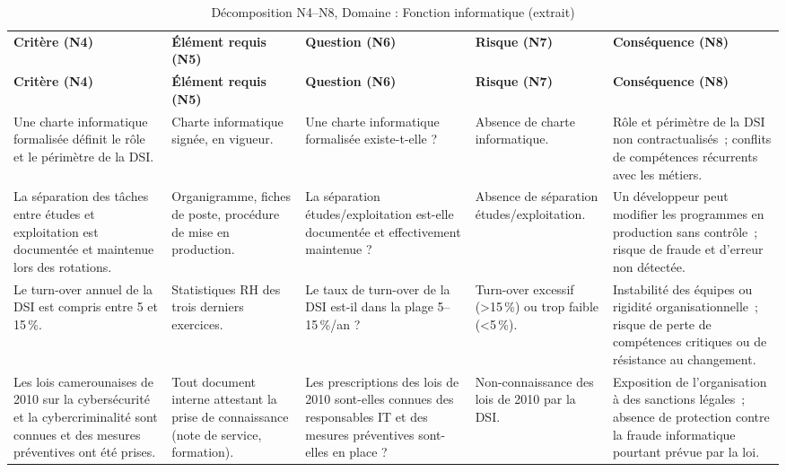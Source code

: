 \begin{longtable}{p{2.3cm}p{2.3cm}p{2.1cm}p{2.0cm}p{2.3cm}}
\small
\caption{Décomposition N4--N8, Domaine : Fonction informatique (extrait)} \\
\toprule
\textbf{Critère (N4)} & \textbf{Élément requis (N5)} & \textbf{Question (N6)} & \textbf{Risque (N7)} & \textbf{Conséquence (N8)} \\
\midrule
\endfirsthead
\toprule
\textbf{Critère (N4)} & \textbf{Élément requis (N5)} & \textbf{Question (N6)} & \textbf{Risque (N7)} & \textbf{Conséquence (N8)} \\
\midrule
\endhead
\bottomrule
\endlastfoot

Une charte informatique formalisée définit le rôle et le périmètre de la DSI. &
Charte informatique signée, en vigueur. &
Une charte informatique formalisée existe-t-elle ? &
Absence de charte informatique. &
Rôle et périmètre de la DSI non contractualisés~; conflits de compétences récurrents avec les métiers. \\
\addlinespace

La séparation des tâches entre études et exploitation est documentée et maintenue lors des rotations. &
Organigramme, fiches de poste, procédure de mise en production. &
La séparation études/exploitation est-elle documentée et effectivement maintenue ? &
Absence de séparation études/exploitation. &
Un développeur peut modifier les programmes en production sans contrôle~; risque de fraude et d'erreur non détectée. \\
\addlinespace

Le turn-over annuel de la DSI est compris entre 5 et 15\,\%. &
Statistiques RH des trois derniers exercices. &
Le taux de turn-over de la DSI est-il dans la plage 5--15\,\%/an ? &
Turn-over excessif (>15\,\%) ou trop faible (<5\,\%). &
Instabilité des équipes ou rigidité organisationnelle~; risque de perte de compétences critiques ou de résistance au changement. \\
\addlinespace

Les lois camerounaises de 2010 sur la cybersécurité et la cybercriminalité sont connues et des mesures préventives ont été prises. &
Tout document interne attestant la prise de connaissance (note de service, formation). &
Les prescriptions des lois de 2010 sont-elles connues des responsables IT et des mesures préventives sont-elles en place ? &
Non-connaissance des lois de 2010 par la DSI. &
Exposition de l'organisation à des sanctions légales~; absence de protection contre la fraude informatique pourtant prévue par la loi. \\

\end{longtable}


